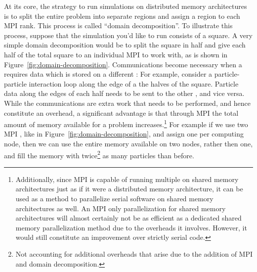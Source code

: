 At its core, the strategy to run simulations on distributed memory architectures is to split the
entire problem into separate regions and assign a region to each MPI rank. This process is called
``domain decomposition''. To illustrate this process, suppose that the simulation you'd like to run
consists of a square. A very simple domain decomposition would be to split the square in half and
give each half of the total square to an individual MPI  to work with, as is shown in
Figure~\ref{fig:domain-decomposition}. Communications become necessary when a  requires
data which is stored on a different : For example, consider a particle-particle
interaction loop along the edge of a the halves of the square. Particle data along the edges of each
half needs to be sent to the other , and vice versa. While the communications are extra
work that needs to be performed, and hence constitute an overhead, a significant advantage is that
through MPI the total amount of memory available for a problem increases.\footnote{
Additionally, since MPI is capable of running multiple  on shared memory architectures
just as if it were a distributed memory architecture, it can be used as a method to parallelize
serial software on shared memory architectures as well. An MPI only parallelization for shared
memory architectures will almost certainly not be as efficient as a dedicated shared memory
parallelization method due to the overheads it involves. However, it would still constitute an
improvement over strictly serial code.}
For example if we use two MPI , like in Figure~\ref{fig:domain-decomposition}, and
assign one  per computing node, then we can use the entire memory available on two
nodes, rather then one, and fill the memory with twice\footnote{Not accounting for additional
overheads that arise due to the addition
of MPI and domain decomposition.}  as many particles than before.

